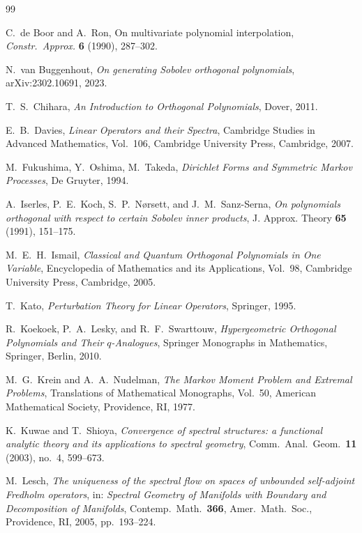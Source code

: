 \documentclass{amsart}
\numberwithin{equation}{section}
\theoremstyle{definition}
\theoremstyle{remark}
\begin{document}
\begin{thebibliography}{99}




C.~de Boor and A.~Ron,
On multivariate polynomial interpolation,
\emph{Constr.\ Approx.} \textbf{6} (1990), 287--302.

 N.~van Buggenhout,
\emph{On generating Sobolev orthogonal polynomials}, arXiv:2302.10691, 2023.

T.~S.~Chihara,
\emph{An Introduction to Orthogonal Polynomials},
Dover, 2011.

E.~B.~Davies,
\emph{Linear Operators and their Spectra},
Cambridge Studies in Advanced Mathematics, Vol.~106,
Cambridge University Press, Cambridge, 2007.

M.~Fukushima, Y.~Oshima, M.~Takeda,
\emph{Dirichlet Forms and Symmetric Markov Processes},
De Gruyter, 1994.

A.~Iserles, P.~E.~Koch, S.~P.~N{\o}rsett, and J.~M.~Sanz-Serna,
\emph{On polynomials orthogonal with respect to certain Sobolev inner products},
J. Approx. Theory \textbf{65} (1991), 151--175.

M.~E.~H.~Ismail,
\emph{Classical and Quantum Orthogonal Polynomials in One Variable},
Encyclopedia of Mathematics and its Applications, Vol.~98,
Cambridge University Press, Cambridge, 2005.

T.~Kato,
\emph{Perturbation Theory for Linear Operators},
Springer, 1995.

R.~Koekoek, P.~A.~Lesky, and R.~F.~Swarttouw,
\emph{Hypergeometric Orthogonal Polynomials and Their $q$-Analogues},
Springer Monographs in Mathematics,
Springer, Berlin, 2010.

M.~G.~Krein and A.~A.~Nudelman,
\emph{The Markov Moment Problem and Extremal Problems},
Translations of Mathematical Monographs, Vol.~50,
American Mathematical Society, Providence, RI, 1977.

K.~Kuwae and T.~Shioya,
\emph{Convergence of spectral structures: a functional analytic theory and its applications to spectral geometry},
Comm.\ Anal.\ Geom.\ \textbf{11} (2003), no.~4, 599--673.

M.~Lesch,
\emph{The uniqueness of the spectral flow on spaces of unbounded self-adjoint Fredholm operators},
in: \emph{Spectral Geometry of Manifolds with Boundary and Decomposition of Manifolds},
Contemp.\ Math.\ \textbf{366}, Amer.\ Math.\ Soc., Providence, RI, 2005, pp.~193--224.


\end{thebibliography}
\end{document}
